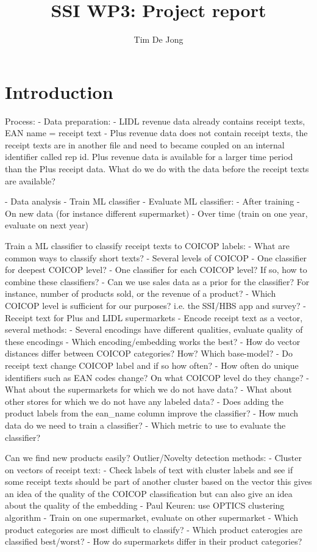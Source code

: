 \documentclass{article}
\title{SSI WP3: Project report}
\author{Tim De Jong}
\begin{document}
\maketitle


\section{Introduction}

Process:
- Data preparation:
    - LIDL revenue data already contains receipt texts, EAN name = receipt text
    - Plus revenue data does not contain receipt texts, the receipt texts are in another file and need to became
    coupled on an internal identifier called rep id. Plus revenue data is available for a larger time period than the
    Plus receipt data. What do we do with the data before the receipt texts are available?

- Data analysis
- Train ML classifier
- Evaluate ML classifier:
    - After training
    - On new data (for instance different supermarket)
    - Over time (train on one year, evaluate on next year)




Train a ML classifier to classify receipt texts to COICOP labels:
- What are common ways to classify short texts?
- Several levels of COICOP
    - One classifier for deepest COICOP level?
    - One classifier for each COICOP level? If so, how to combine these classifiers?
    - Can we use sales data as a prior for the classifier? For instance, number of products sold, 
    or the revenue of a product?
    - Which COICOP level is sufficient for our purposes? i.e. the SSI/HBS app and survey?
- Receipt text for Plus and LIDL supermarkets
- Encode receipt text as a vector, several methods: 
    - Several encodings have different qualities, evaluate quality of these encodings
    - Which encoding/embedding works the best?
    - How do vector distances differ between COICOP categories? How? Which base-model?
- Do receipt text change COICOP label and if so how often?
- How often do unique identifiers such as EAN codes change? On what COICOP level do they change?
- What about the supermarkets for which we do not have data? 
- What about other stores for which we do not have any labeled data?
- Does adding the product labels from the ean\_name column improve the classifier?
- How much data do we need to train a classifier?
- Which metric to use to evaluate the classifier?
    
Can we find new products easily? Outlier/Novelty detection methods:    
    - Cluster on vectors of receipt text:
        - Check labels of text with cluster labels and see if some receipt texts should be part of another cluster based on the vector
        this gives an idea of the quality of the COICOP classification but can also give an idea about the quality of the embedding
        - Paul Keuren: use OPTICS clustering algorithm
- Train on one supermarket, evaluate on other supermarket
- Which product categories are most difficult to classify?
- Which product caterogies are classified best/worst?
- How do supermarkets differ in their product categories?
\end{document}
